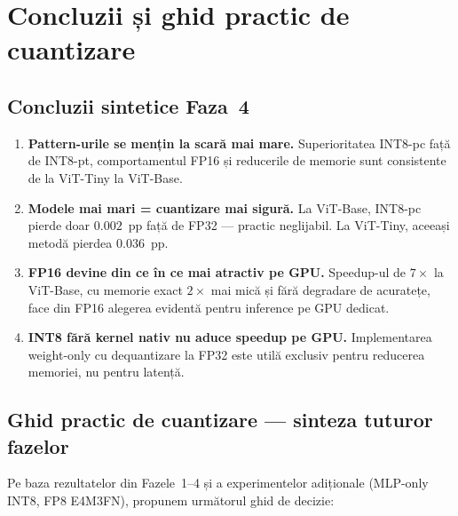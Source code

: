 \documentclass[12pt,a4paper]{article}
\begin{document}
\section{Concluzii și ghid practic de cuantizare}

\subsection{Concluzii sintetice Faza~4}

\begin{enumerate}
  \item \textbf{Pattern-urile se mențin la scară mai mare.}
    Superioritatea INT8-pc față de INT8-pt, comportamentul FP16
    și reducerile de memorie sunt consistente de la ViT-Tiny la ViT-Base.

  \item \textbf{Modele mai mari = cuantizare mai sigură.}
    La ViT-Base, INT8-pc pierde doar $0.002$~pp față de FP32 ---
    practic neglijabil. La ViT-Tiny, aceeași metodă pierdea $0.036$~pp.

  \item \textbf{FP16 devine din ce în ce mai atractiv pe GPU.}
    Speedup-ul de $7\times$ la ViT-Base, cu memorie exact $2\times$
    mai mică și fără degradare de acuratețe, face din FP16 alegerea
    evidentă pentru inference pe GPU dedicat.

  \item \textbf{INT8 fără kernel nativ nu aduce speedup pe GPU.}
    Implementarea weight-only cu dequantizare la FP32 este utilă
    exclusiv pentru reducerea memoriei, nu pentru latență.
\end{enumerate}

\subsection{Ghid practic de cuantizare --- sinteza tuturor fazelor}

Pe baza rezultatelor din Fazele~1--4 și a experimentelor adiționale
(MLP-only INT8, FP8 E4M3FN), propunem următorul ghid de decizie:
\end{document}

